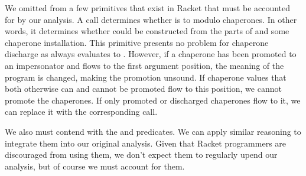 \documentclass{sigplanconf}
\begin{document}
We omitted from \chapcalc a few primitives that exist in Racket that must be accounted for by our analysis.
A call  determines whether  is  to  modulo chaperones.
In other words, it determines whether  could be constructed from the parts of  and some chaperone installation.
This primitive presents no problem for chaperone discharge as  always evaluates to .
However, if a chaperone has been promoted to an impersonator and flows to the first argument position, the meaning of the program is changed, making the promotion unsound.
If chaperone values that both otherwise can and cannot be promoted flow to this position, we cannot promote the chaperones.
If only promoted or discharged chaperones flow to it, we can replace it with the corresponding  call.

We also must contend with the  and  predicates. We can apply similar reasoning to integrate them into our original analysis.
Given that Racket programmers are discouraged from using them, we don't expect them to regularly upend our analysis, but of course we must account for them.



\end{document}
